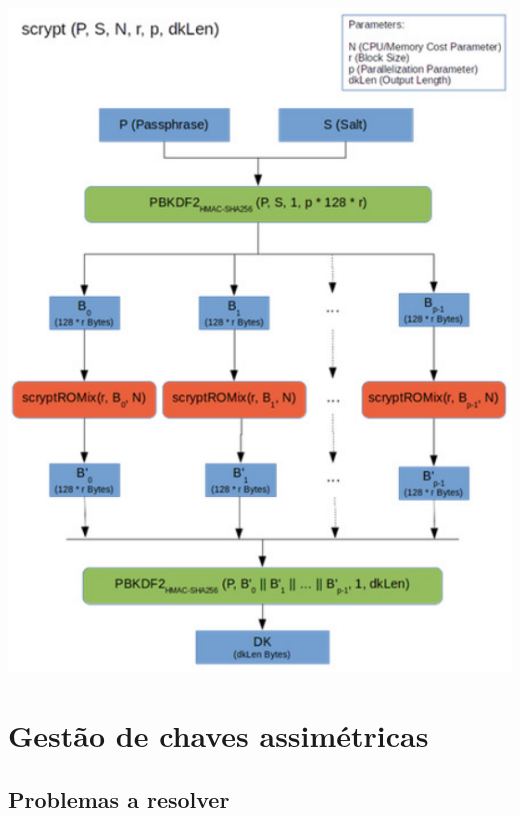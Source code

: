 \documentclass{article}
\begin{document}
\begin{center}
  \includegraphics[scale=0.3]{15}
\end{center}

\pagebreak

\section{Gestão de chaves assimétricas}

\subsection{Problemas a resolver}
\end{document}
